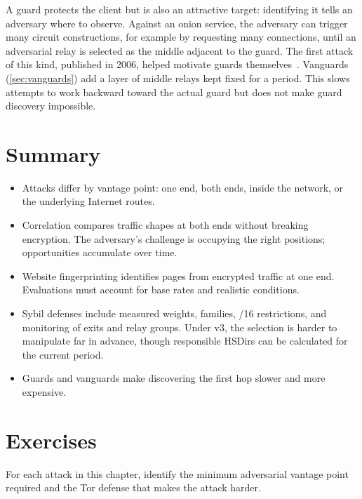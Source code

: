 A guard protects the client but is also an attractive target: identifying it tells an adversary where to observe. Against an onion service, the adversary can trigger many circuit constructions, for example by requesting many connections, until an adversarial relay is selected as the middle adjacent to the guard. The first attack of this kind, published in 2006, helped motivate guards themselves~\cite{overlier2006locating}. Vanguards (\cref{sec:vanguards}) add a layer of middle relays kept fixed for a period. This slows attempts to work backward toward the actual guard but does not make guard discovery impossible.

\section*{Summary}
\begin{itemize}
  \item Attacks differ by vantage point: one end, both ends, inside the network, or the underlying Internet routes.
  \item Correlation compares traffic shapes at both ends without breaking encryption. The adversary's challenge is occupying the right positions; opportunities accumulate over time.
  \item Website fingerprinting identifies pages from encrypted traffic at one end. Evaluations must account for base rates and realistic conditions.
  \item Sybil defenses include measured weights, families, /16 restrictions, and monitoring of exits and relay groups. Under v3, the selection is harder to manipulate far in advance, though responsible HSDirs can be calculated for the current period.
  \item Guards and vanguards make discovering the first hop slower and more expensive.
\end{itemize}

\section*{Exercises}

\begin{esercizio}[1]\label{es:26-posizione}
For each attack in this chapter, identify the minimum adversarial vantage point required and the Tor defense that makes the attack harder.
\end{esercizio}

